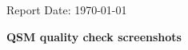 \documentclass[12pt, letterpaper]{article}
\begin{document}
Report Date: \today

\textbf{{\Large QSM quality check screenshots}}
\vspace*{16pt}


\end{document}
